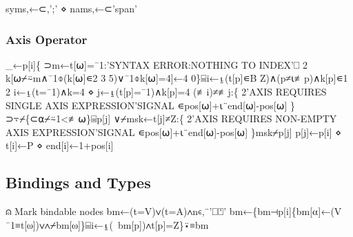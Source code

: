 \documentclass{article}%
\begin{document}
\nwenddocs{}\plusendmoddef\nwstartdeflinemarkup{}\nwenddeflinemarkup
syms,←⊂,';' ⋄ nams,←⊂'span'
\nwendcode{}\nwdocspar

\subsubsection{Axis Operator}

\nwenddocs{}\endmoddef\nwstartdeflinemarkup{}\nwenddeflinemarkup
_←p[i]\{
        ⊃m←t[⍵]=¯1:'SYNTAX ERROR:NOTHING TO INDEX'⎕ 2
        k[⍵⌿⍨m∧¯1⌽(k[⍵]∊2 3 5)∨¯1⌽k[⍵]=4]←4
0\}⌸i←⍸(t[p]∊B Z)∧(p≠⍳≢p)∧k[p]∊1 2
i←⍸(t=¯1)∧k=4 ⋄ j←⍸(t[p]=¯1)∧k[p]=4
(≢i)≠≢j:\{
        2'AXIS REQUIRES SINGLE AXIS EXPRESSION'SIGNAL ∊pos[⍵]+⍳¨end[⍵]-pos[⍵]
\}⊃⍪⌿\{⊂⍺⌿⍨1<≢⍵\}⌸p[j]
∨⌿msk←t[j]≠Z:\{
        2'AXIS REQUIRES NON-EMPTY AXIS EXPRESSION'SIGNAL ∊pos[⍵]+⍳¨end[⍵]-pos[⍵]
\}msk⌿p[j]
p[j]←p[i] ⋄ t[i]←P ⋄ end[i]←1+pos[i]
\nwendcode{}\nwdocspar

\subsection{Bindings and Types}

\nwenddocs{}\endmoddef\nwstartdeflinemarkup{}\nwenddeflinemarkup
⍝ Mark bindable nodes
bm←(t=V)∨(t=A)∧n∊,¨'⎕⍞'
bm←\{bm⊣p[i]\{bm[⍺]←(V ¯1≡t[⍵])∨∧⌿bm[⍵]\}⌸i←⍸(~bm[p])∧t[p]=Z\}⍣≡bm
\end{document}
